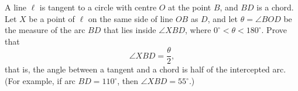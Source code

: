 A line $\ell$ is tangent to a circle with centre $O$ at the point $B$, and $BD$ is a chord. Let $X$ be a point of $\ell$ on the same side of line $OB$ as $D$, and let $\theta=\angle BOD$ be the measure of the arc $BD$ that lies inside $\angle XBD$, where $0^\circ<\theta<180^\circ$. Prove that
\[
\angle XBD=\dfrac{\theta}{2},
\]
that is, the angle between a tangent and a chord is half of the intercepted arc. (For example, if arc $BD=110^\circ$, then $\angle XBD=55^\circ$.)
